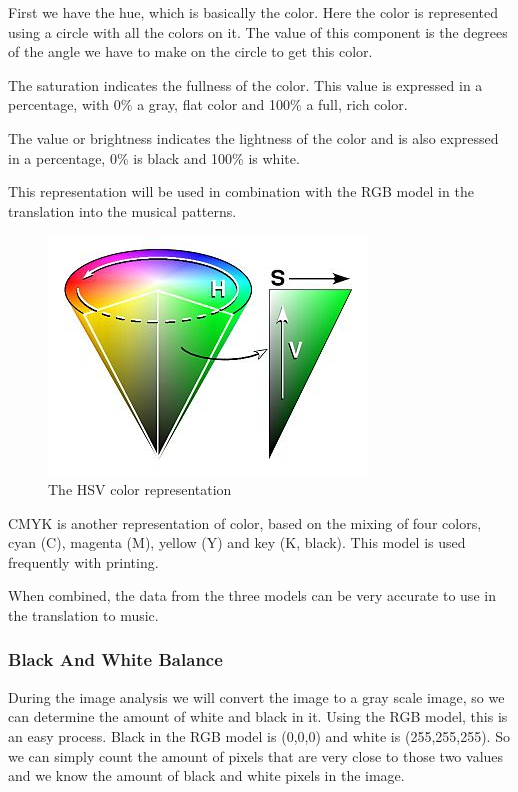 \documentclass[12pt]{article}
\begin{document}
First we have the hue, which is basically the color. Here the color is represented using a circle with all the colors on it. The value of this component is the degrees of the angle we have to make on the circle to get this color.  

The saturation indicates the fullness of the color. This value is expressed in a percentage, with 0\% a gray, flat color and 100\%  a full, rich color.

The value or brightness indicates the lightness of the color and is also expressed in a percentage, 0\% is black and 100\% is white.

This representation will be used in combination with the RGB model in the translation into the musical patterns.
\newline

\begin{figure}[h]
\centering
\includegraphics[scale = 0.45]{img/hsv}
\caption{The HSV color representation}
\end{figure}

CMYK is another representation of color, based on the mixing of four colors, cyan (C), magenta (M), yellow (Y) and key (K, black). This model is used frequently with printing.
\newline

When combined, the data from the three models can be very accurate to use in the translation to music.

\subsubsection{Black And White Balance}
During the image analysis we will convert the image to a gray scale image, so we can determine the amount of white and black in it. Using the RGB model, this is an easy process. Black in the RGB model is (0,0,0) and white is (255,255,255). So we can simply count the amount of pixels that are very close to those two values and we know the amount of black and white pixels in the image.
\newline
\end{document}
